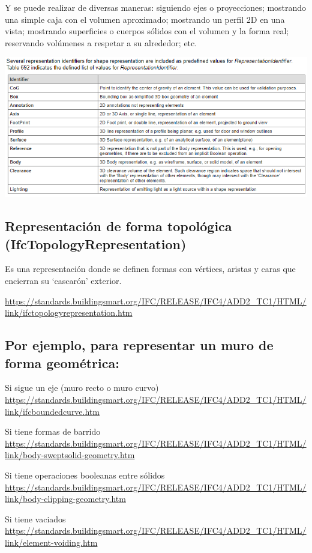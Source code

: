 \documentclass[spanish,12pt,a4paper,final,oneside]{book}
\begin{document}
Y se puede realizar de diversas maneras: siguiendo ejes o proyecciones; mostrando una simple caja con el volumen aproximado; mostrando un perfil 2D en una vista; mostrando superficies o cuerpos sólidos con el volumen y la forma real; reservando volúmenes a respetar a su alrededor; etc.

\includegraphics[width=\textwidth]{RepresentationIdentifier}


\subsection{Representación de forma topológica (IfcTopologyRepresentation)}

Es una representación donde se definen formas con vértices, aristas y caras que encierran su `cascarón' exterior.

\url{https://standards.buildingsmart.org/IFC/RELEASE/IFC4/ADD2_TC1/HTML/link/ifctopologyrepresentation.htm}


\subsection{Por ejemplo, para representar un muro de forma geométrica:}
Si sigue un eje (muro recto o muro curvo)
\\ \url{https://standards.buildingsmart.org/IFC/RELEASE/IFC4/ADD2_TC1/HTML/link/ifcboundedcurve.htm}

Si tiene formas de barrido
\\ \url{https://standards.buildingsmart.org/IFC/RELEASE/IFC4/ADD2_TC1/HTML/link/body-sweptsolid-geometry.htm}

Si tiene operaciones booleanas entre sólidos
\\ \url{https://standards.buildingsmart.org/IFC/RELEASE/IFC4/ADD2_TC1/HTML/link/body-clipping-geometry.htm}

Si tiene vaciados
\\ \url{https://standards.buildingsmart.org/IFC/RELEASE/IFC4/ADD2_TC1/HTML/link/element-voiding.htm}
\end{document}
